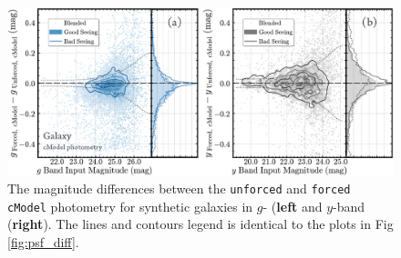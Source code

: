 \documentclass[useamsfonts]{pasj01}
\def\cmodel{\texttt{cModel}}
\def\forced{\texttt{forced}}
\def\unforced{\texttt{unforced}}
\begin{document}
\begin{figure}
    \begin{center}
        \includegraphics[width=\textwidth]{fig/synpipe_cmodel_diff}
    \end{center}
    \caption{
        The magnitude differences between the \unforced{} and \forced{}
        \cmodel{} photometry for synthetic galaxies in $g$- (\textbf{left} and
        $y$-band (\textbf{right}).
        The lines and contours legend is identical to the plots in Fig \ref{fig:psf_diff}.
        }
    \label{fig:cmodel_diff}
\end{figure}
\end{document}
